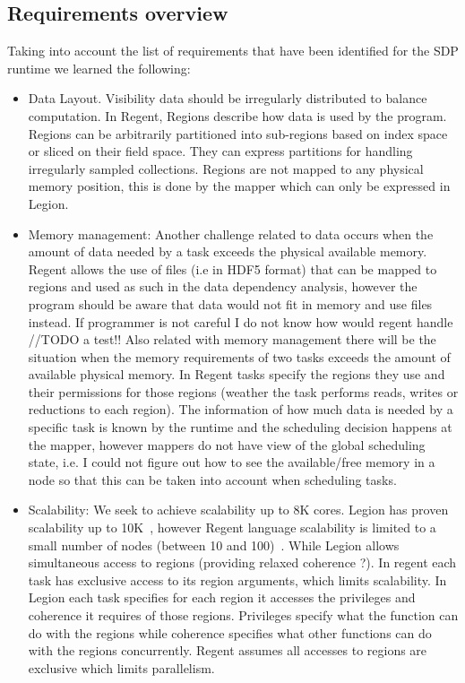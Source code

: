 \subsection{Requirements overview}

Taking into account the list of requirements that have been identified for the SDP runtime we learned the following: 
\begin{itemize}
\item Data Layout. Visibility data should be irregularly distributed to balance computation. In Regent, Regions describe how data is used by the program. Regions can be arbitrarily partitioned into sub-regions based on index space or sliced on their field space. They can express partitions for handling irregularly sampled collections. Regions are not mapped to any physical memory position, this is done by the mapper which can only be expressed in Legion.
\item Memory management: Another challenge related to data occurs when the amount of data needed by a task exceeds the physical available memory. 
Regent allows the use of files (i.e in HDF5 format) that can be mapped to regions and used as such in the data dependency analysis, however the program should be aware that data would not fit in memory and use files instead. If programmer is not careful I do not know how would regent handle //TODO a test!! Also related with memory management there will be the situation when the memory requirements of two tasks exceeds the amount of available physical memory. In Regent tasks specify the regions they use and their permissions for those regions (weather the task performs reads, writes or reductions to each region). The information of how much data is needed by a specific task is known by the runtime and the scheduling decision happens at the mapper, however  mappers do not have view of the global scheduling state, i.e. I could not figure out how to see the available/free memory in a node so that this can be taken into account when scheduling tasks.   
\item Scalability: We seek to achieve scalability up to 8K cores. Legion has proven scalability up to 10K~\cite{MBauerPhD}, however Regent language scalability is limited to a small number of nodes (between 10 and 100)~\cite{Regent}. While Legion allows simultaneous access to regions (providing relaxed coherence ?). In regent each task has exclusive access to its region arguments, which limits scalability.
In Legion each task specifies for each region it accesses the privileges and coherence it requires of those regions. Privileges specify what the function can do with the regions while coherence specifies what other functions can do with the regions concurrently. Regent assumes all accesses to regions are exclusive which limits parallelism.

\end{itemize}
